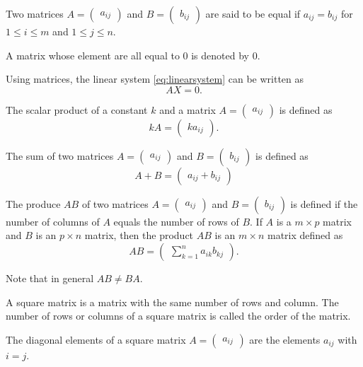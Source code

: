Two matrices $A=\begin{pmatrix}
  a_{ij}
\end{pmatrix}$ and $B=\begin{pmatrix}
  b_{ij}
\end{pmatrix}$ are said to be equal if $a_{ij}=b_{ij}$ for $1\le i\le m$ and $1\le j\le n$.

A matrix whose element are all equal to $0$ is denoted by $0$.

Using matrices, the linear system \ref{eq:linearsystem} can be written as
\[AX=0.\]

The scalar product of a constant $k$ and a matrix $A=\begin{pmatrix}
  a_{ij}
\end{pmatrix}$ is defined as
\[kA=\begin{pmatrix}
  ka_{ij}
\end{pmatrix}.\]

The sum of two matrices $A=\begin{pmatrix}
  a_{ij}
\end{pmatrix}$ and $B=\begin{pmatrix}
  b_{ij}
\end{pmatrix}$ is defined as
\[A+B=\begin{pmatrix}
  a_{ij}+b_{ij}
\end{pmatrix}\]

The produce $AB$ of two matrices $A=\begin{pmatrix}
  a_{ij}
\end{pmatrix}$ and $B=\begin{pmatrix}
  b_{ij}
\end{pmatrix}$ is defined if the number of columns of $A$ equals the number of rows of $B$. If $A$ is a $m\times p$ matrix and $B$ is an $p\times n$ matrix, then the product $AB$ is an $m\times n$ matrix defined as
\[AB=\begin{pmatrix}
  \sum\limits_{k=1}^na_{ik}b_{kj}
\end{pmatrix}.\]

Note that in general $AB\neq BA$.

A square matrix is a matrix with the same number of rows and column. The number of rows or columns of a square matrix is called the order of the matrix.

The diagonal elements of a square matrix $A=\begin{pmatrix}
  a_{ij}
\end{pmatrix}$ are the elements $a_{ij}$ with $i=j$.

